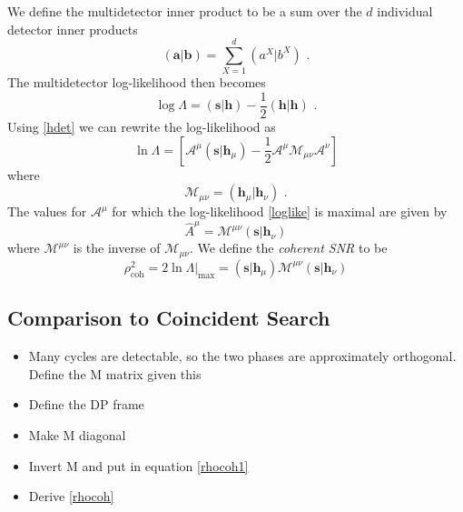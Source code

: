 \documentclass[12pt,twoside,a4paper]{report}
\begin{document}
We define the multidetector inner product to be a sum over the $d$ individual detector inner products
\begin{equation}
(\textbf{a}|\textbf{b}) = \sum_{X=1}^d (a^X|b^X) \textbf{ .}
\end{equation}
The multidetector log-likelihood then becomes
\begin{equation}
\log \Lambda = (\textbf{s}|\textbf{h}) - \frac{1}{2}(\textbf{h}|\textbf{h}) \textbf{ .}
\end{equation}
Using \ref{hdet} we can rewrite the log-likelihood as 
\begin{equation} \label{loglike}
\ln \Lambda = \left[ \mathcal{A}^\mu(\textbf{s}|\textbf{h}_\mu) - \frac{1}{2}\mathcal{A}^\mu \mathcal{M}_{\mu\nu}\mathcal{A}^\nu \right]
\end{equation}
where
\begin{equation}
\mathcal{M}_{\mu\nu} = (\textbf{h}_\mu|\textbf{h}_\nu) \textbf{ .}
\end{equation}
The values for $\mathcal{A}^\mu$ for which the log-likelihood \ref{loglike} is maximal are given by
\begin{equation}
\hat{A}^\mu =\mathcal{M}^{\mu\nu}(\textbf{s}|\textbf{h}_\nu)
\end{equation}
where $\mathcal{M}^{\mu\nu}$ is the inverse of $\mathcal{M}_{\mu\nu}$. We define the \textit{coherent SNR} to be
\begin{equation} \label{rhocoh1}
\rho^2_\text{coh} = 2\ln \Lambda |_\text{max} = (\textbf{s}|\textbf{h}_\mu)\mathcal{M}^{\mu\nu}(\textbf{s}|\textbf{h}_\nu)
\end{equation}

\subsection{Comparison to Coincident Search}
\begin{itemize}
\item Many cycles are detectable, so the two phases are approximately orthogonal. Define the M matrix given this
\item Define the DP frame
\item Make M diagonal
\item Invert M and put in equation \ref{rhocoh1}
\item Derive \ref{rhocoh}
\end{itemize}
\end{document}

